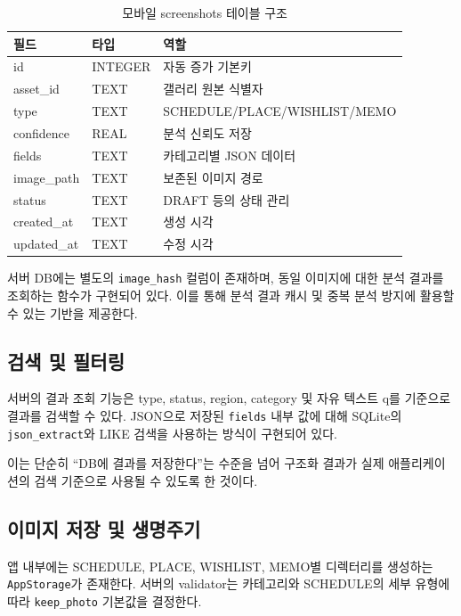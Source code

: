 \documentclass[11pt,a4paper]{article}
\begin{document}
\begin{table}[H]
\centering
\small
\begin{tabularx}{\linewidth}{l l Y}
\toprule
\textbf{필드} & \textbf{타입} & \textbf{역할}\\
\midrule
id & INTEGER & 자동 증가 기본키\\
asset\_id & TEXT & 갤러리 원본 식별자\\
type & TEXT & SCHEDULE/PLACE/WISHLIST/MEMO\\
confidence & REAL & 분석 신뢰도 저장\\
fields & TEXT & 카테고리별 JSON 데이터\\
image\_path & TEXT & 보존된 이미지 경로\\
status & TEXT & DRAFT 등의 상태 관리\\
created\_at & TEXT & 생성 시각\\
updated\_at & TEXT & 수정 시각\\
\bottomrule
\end{tabularx}
\caption{모바일 screenshots 테이블 구조}
\end{table}

서버 DB에는 별도의 \texttt{image\_hash} 컬럼이 존재하며, 동일 이미지에 대한 분석 결과를 조회하는 함수가 구현되어 있다. 이를 통해 분석 결과 캐시 및 중복 분석 방지에 활용할 수 있는 기반을 제공한다.

\subsection{검색 및 필터링}

서버의 결과 조회 기능은 type, status, region, category 및 자유 텍스트 q를 기준으로 결과를 검색할 수 있다. JSON으로 저장된 \texttt{fields} 내부 값에 대해 SQLite의 \texttt{json\_extract}와 LIKE 검색을 사용하는 방식이 구현되어 있다.

이는 단순히 ``DB에 결과를 저장한다''는 수준을 넘어 구조화 결과가 실제 애플리케이션의 검색 기준으로 사용될 수 있도록 한 것이다.

\subsection{이미지 저장 및 생명주기}

앱 내부에는 SCHEDULE, PLACE, WISHLIST, MEMO별 디렉터리를 생성하는 \texttt{AppStorage}가 존재한다. 서버의 validator는 카테고리와 SCHEDULE의 세부 유형에 따라 \texttt{keep\_photo} 기본값을 결정한다.
\end{document}
